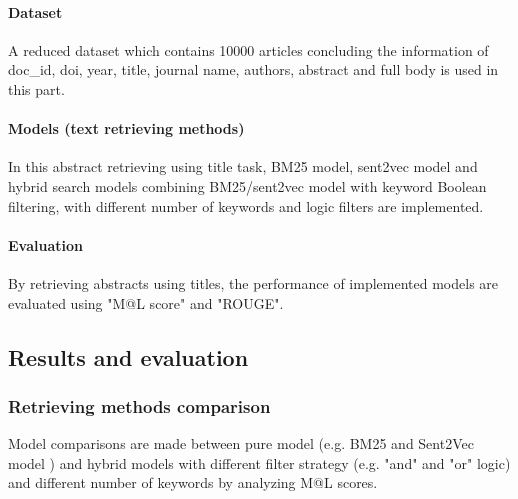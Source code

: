 \documentclass[10pt,a4paper,fleqn]{report}
\begin{document}
			\paragraph{Dataset}
			A reduced dataset which contains 10000 articles concluding the information of doc\_id, doi, year, title, journal name, authors, abstract and full body is used in this part.
			
			\paragraph{Models (text retrieving methods)}
			In this abstract retrieving using title task, 
			BM25 model, sent2vec model and hybrid search models combining BM25/sent2vec model with keyword Boolean filtering, with different number of keywords and logic filters are implemented.
			
			\paragraph{Evaluation}
			By retrieving abstracts using titles, the performance of implemented models are evaluated using "M@L score" and "ROUGE".
		
		\subsection{Results and evaluation}
			\subsubsection{Retrieving methods comparison}
			
				Model comparisons are made between pure model (e.g. BM25 and Sent2Vec model ) and hybrid models with different filter strategy (e.g. "and" and "or" logic) and different number of keywords by analyzing M@L scores.
				
\end{document}
